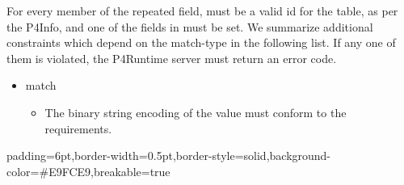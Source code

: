 \documentclass[11pt]{article}
\begin{document}
{%
\noindent{}For every member of the  repeated  field,  must be
a valid id for the table, as per the P4Info, and one of the fields in
 must be set. We summarize additional constraints which depend
on the match-type in the following list. If any one of them is violated, the
P4Runtime server must return an  error code.%

\begin{itemize}[noitemsep,topsep=\mdcompacttopsep]%

\item{} match

\begin{itemize}[noitemsep,topsep=\mdcompacttopsep]%

\item{}The binary string encoding of the value must conform to the
 requirements.%
\end{itemize}%
\end{itemize}%

\begin{mdbmargintb}{6pt}{6pt}%
\begin{mdblock}{padding=6pt,border-width=0.5pt,border-style=solid,background-color=\#E9FCE9,breakable=true}%
\begin{mdpre}%
\end{mdpre}%
\end{mdblock}%
\end{mdbmargintb}%

\begin{itemize}[noitemsep,topsep=\mdcompacttopsep]%


\end{itemize}}
\end{document}
